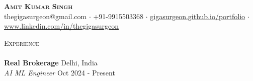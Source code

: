 \documentclass[a4paper]{article}
\newcommand{\lineunder} {
    \vspace*{-8pt} \\
    \hspace*{-18pt} \hrulefill \\
}
\newcommand{\header} [1] {
    {\hspace*{-18pt}\vspace*{6pt} \textsc{#1}}
    \vspace*{-6pt} \lineunder
}
\begin{document}
\vspace*{-40pt}

\vspace*{-10pt}
\begin{center}
	{\Huge \scshape \textbf{Amit Kumar Singh}}\\
	thegigasurgeon@gmail.com $\cdot$ +91-9915503368 $\cdot$ \href{https://gigasurgeon.github.io/portfolio/}{gigasurgeon.github.io/portfolio} $\cdot$ \href{https://www.linkedin.com/in/thegigasurgeon/}{www.linkedin.com/in/thegigasurgeon}\\
\end{center}

\header{Experience}
\vspace{1mm}
\textbf{Real Brokerage} \hfill Delhi, India\\
\textit{AI ML Engineer} \hfill Oct 2024 - Present\\
\end{document}
